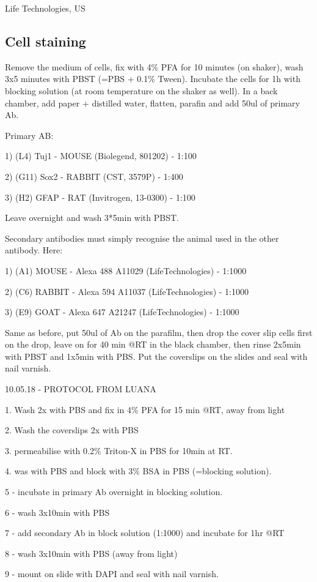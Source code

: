 \documentclass[onecolumn,10pt]{asme2ej}
\begin{document}
Life Technologies, US

\subsection{Cell staining}
Remove the medium of cells, fix with 4\% PFA for 10 minutes (on shaker), wash 3x5 minutes with PBST (=PBS + 0.1\% Tween). 
Incubate the cells for 1h with blocking solution (at room temperature on the shaker as well).
In a back chamber, add paper + distilled water, flatten, parafin and add 50ul of primary Ab.

Primary AB:

1) (L4) Tuj1 - MOUSE (Biolegend, 801202) - 1:100

2) (G11) Sox2 - RABBIT (CST, 3579P) - 1:400

3) (H2) GFAP - RAT (Invitrogen, 13-0300) - 1:100

Leave overnight and wash 3*5min with PBST. 

Secondary antibodies must simply recognise the animal used in the other antibody. Here:

1) (A1) MOUSE - Alexa 488 A11029 (LifeTechnologies) - 1:1000

2) (C6) RABBIT - Alexa 594 A11037  (LifeTechnologies) - 1:1000

3) (E9) GOAT - Alexa 647 A21247  (LifeTechnologies) - 1:1000

Same as before, put 50ul of Ab on the parafilm, then drop the cover slip cells first on the drop, leave on for 40 min @RT in the black chamber, then rinse 2x5min with PBST and 1x5min with PBS. Put the coverslips on the slides and seal with nail varnish.  


10.05.18 - PROTOCOL FROM LUANA

1. Wash 2x with PBS and fix in 4\% PFA for 15 min @RT, away from light

2. Wash the coverslips 2x with PBS

3. permeabilise with 0.2\% Triton-X in PBS for 10min at RT.

4. was with PBS and block with 3\% BSA in PBS (=blocking solution).

5 - incubate in primary Ab overnight in blocking solution.

6 - wash 3x10min with PBS 

7 - add secondary Ab in block solution (1:1000) and incubate for 1hr @RT

8 - wash 3x10min with PBS (away from light)

9 - mount on slide with DAPI and seal with nail varnish.
\end{document}
